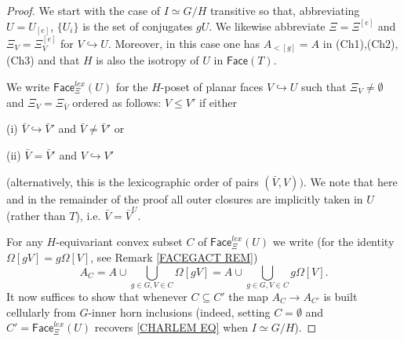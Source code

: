 \documentclass[a4paper,10pt
 ,draft
]{article}%
\begin{document}
\begin{proof}
We start with the case of $I \simeq G/H$ transitive so that, abbreviating $U = U_{[e]}$, $\{U_i\}$ is the set of conjugates $gU$. 
We likewise abbreviate $\Xi = \Xi^{[e]}$ and
$\Xi_V = \Xi_V^{[e]}$ for $V \hookrightarrow U$.
Moreover, in this case one has $A_{<[g]}=A$ in (Ch1),(Ch2),(Ch3) and that $H$ is also the isotropy of $U$ in $\mathsf{Face}(T)$.

We write $\mathsf{Face}_{\Xi}^{lex}(U)$
for the $H$-poset of planar faces $V \hookrightarrow U$
such that $\Xi_V \neq \emptyset$ and $\Xi_V = \Xi_{\bar{V}}$
ordered as follows: 
$V \leq V'$ if either
	\begin{inparaenum}
		\item[(i)] $\bar{V} \hookrightarrow \bar{V}'$ and 
		$\bar{V} \neq \bar{V}'$ or
		\item[(ii)] $\bar{V} = \bar{V}'$ and
		$V \hookrightarrow V'$
	\end{inparaenum}
(alternatively, this is the lexicographic order of pairs $(\bar{V},V))$.
We note that here and in the remainder of the proof all outer closures are implicitly taken in $U$ (rather than $T$), i.e. 
$\bar{V}=\bar{V}^U$.

For any $H$-equivariant convex subset $C$ of $\mathsf{Face}_{\Xi}^{lex}(U)$ we write (for the identity $\Omega[gV]=g\Omega[V]$, see Remark \ref{FACEGACT REM})
\[
A_C = 
A \cup \bigcup_{g\in G,V \in C} \Omega[gV]= 
A \cup \bigcup_{g\in G,V \in C} g \Omega[V].
\]
It now suffices to show that whenever
$C \subseteq C'$
the map 
$A_C \to A_{C'}$ is built cellularly from 
$G$-inner horn inclusions
(indeed, setting $C=\emptyset$ and 
$C'=\mathsf{Face}_{\Xi}^{lex}(U)$ recovers \eqref{CHARLEM EQ}
when $I \simeq G/H$).


\end{proof}
\end{document}
